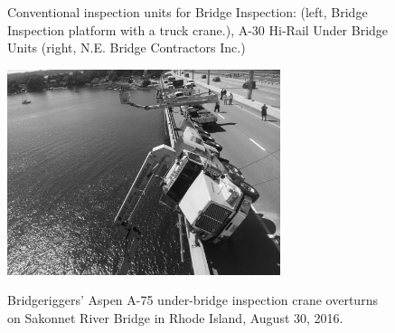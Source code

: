 \documentclass[12pt]{report}
\begin{document}
\begin{figure}[htp]
	\centering 
	\caption{Conventional inspection units for Bridge Inspection: (left, Bridge Inspection platform with a truck crane.), A-30 Hi-Rail Under Bridge Units (right, N.E. Bridge Contractors Inc.)} \cite{truckCrane}
   \label{fig:bridge_inspection}
\end{figure}

\begin{figure}[htp]
	\centering 
    \includegraphics[width=8cm]{tip.jpg}
	\caption{Bridgeriggers' Aspen A-75 under-bridge inspection crane overturns on Sakonnet River Bridge in Rhode Island, August 30, 2016. }\cite{truckCraneOverturn}
   \label{fig:bridge_fail}
\end{figure}
\end{document}

